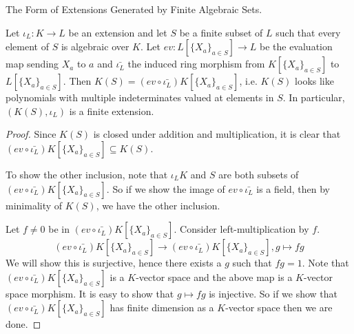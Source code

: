 \documentclass[../book.tex]{subfiles}
\begin{document}
\begin{thm} The Form of Extensions Generated by Finite Algebraic Sets. 

    Let $\iota_L : K \to L$ be an extension and let
    $S$ be a finite subset of $L$ such that 
    every element of $S$ is algebraic over $K$. 
    Let $ev : L[\{X_a\}_{a\in S}] \to L$ be the evaluation map 
    sending $X_a$ to $a$ and 
    $\bar{\iota_L}$ the induced ring morphism 
    from $K[\{X_a\}_{a\in S}]$ to $L[\{X_a\}_{a\in S}]$. 
    Then $K(S) = (ev \circ \bar{\iota_L}) K[\{X_a\}_{a\in S}]$, 
    i.e. $K(S)$ looks like polynomials with multiple indeterminates
    valued at elements in $S$. 
    In particular, $(K(S),\iota_L)$ is a finite extension.  

\end{thm}
\begin{proof}
    
    Since $K(S)$ is closed under addition and multiplication, 
    it is clear that $(ev \circ \bar{\iota_L}) K[\{X_a\}_{a\in S}] \subseteq K(S)$. 
    
    To show the other inclusion, 
    note that $\iota_L K$ and $S$ are both subsets of 
    $(ev \circ \bar{\iota_L}) K[\{X_a\}_{a\in S}]$. 
    So if we show the image of $ev \circ \bar{\iota_L}$ is a field, 
    then by minimality of $K(S)$, we have the other inclusion. 

    Let $f \neq 0$ be in $(ev \circ \bar{\iota_L}) K[\{X_a\}_{a\in S}]$.
    Consider left-multiplication by $f$. \[
        (ev \circ \bar{\iota_L}) K[\{X_a\}_{a\in S}] \to 
        (ev \circ \bar{\iota_L}) K[\{X_a\}_{a\in S}] , 
        g \mapsto f g
    \]
    We will show this is surjective, hence there exists a $g$ such that $fg = 1$. 
    Note that $(ev \circ \bar{\iota_L}) K[\{X_a\}_{a\in S}]$ is 
    a $K$-vector space and the above map is a $K$-vector space morphism. 
    It is easy to show that $g \mapsto f g$ is injective. 
    So if we show that $(ev \circ \bar{\iota_L}) K[\{X_a\}_{a\in S}]$
    has finite dimension as a $K$-vector space then we are done. 
    

\end{proof}
\end{document}

